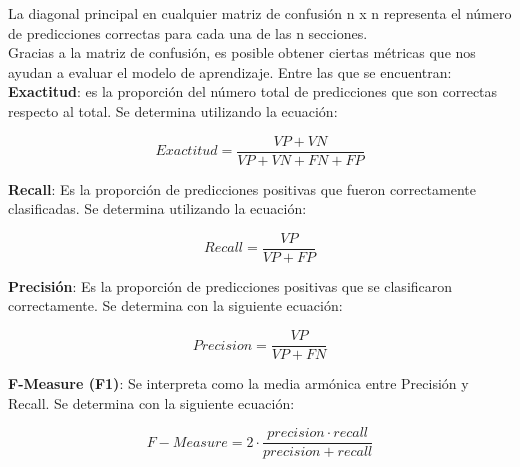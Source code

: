 La diagonal principal en cualquier matriz de confusión n x n representa el número de predicciones
correctas para cada una de las n secciones.\\

Gracias a la matriz de confusión, es posible obtener ciertas métricas que nos ayudan a evaluar el modelo
de aprendizaje. Entre las que se encuentran:\\


\textbf{Exactitud}: es la proporción del número total de predicciones que son correctas respecto al total.
Se determina utilizando la ecuación:

\begin{equation}\label{eq:1}
	Exactitud = \frac{VP+VN}{VP+VN+FN+FP}
\end{equation}

\textbf{Recall}: Es la proporción de predicciones positivas que fueron correctamente clasificadas. Se determina
utilizando la ecuación:


\begin{equation}\label{eq:2}
	Recall = \frac{VP}{VP+FP}
\end{equation}


\textbf{Precisión}: Es la proporción de predicciones positivas que se clasificaron correctamente. Se determina
con la siguiente ecuación:


\begin{equation}\label{eq:3}
	Precision = \frac{VP}{VP+FN}
\end{equation}


\textbf{F-Measure (F1)}: Se interpreta como la media armónica entre Precisión y Recall. Se determina
con la siguiente ecuación:

\begin{equation}\label{eq:3}
	 F-Measure = 2 \cdot \frac{precision \cdot recall}{precision+recall}
\end{equation}

